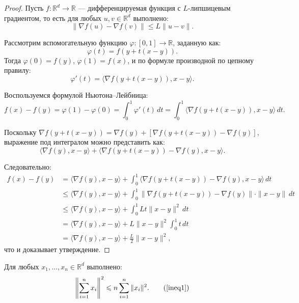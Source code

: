 \begin{proof}
Пусть \(f : \mathbb{R}^d \to \mathbb{R}\) — дифференцируемая функция с \(L\)-липшицевым градиентом, то есть для любых \(u, v \in \mathbb{R}^d\) выполнено:
\[
\|\nabla f(u) - \nabla f(v)\| \leqslant L \|u - v\|.
\]

Рассмотрим вспомогательную функцию \(\varphi : [0, 1] \to \mathbb{R}\), заданную как:
\[
\varphi(t) = f(y + t(x - y)).
\]
Тогда \(\varphi(0) = f(y)\), \(\varphi(1) = f(x)\), и по формуле производной по цепному правилу:
\[
\varphi'(t) = \langle \nabla f(y + t(x - y)), x - y \rangle.
\]

Воспользуемся формулой Ньютона–Лейбница:
\[
f(x) - f(y) = \varphi(1) - \varphi(0) = \int_0^1 \varphi'(t) \, dt = \int_0^1 \langle \nabla f(y + t(x - y)), x - y \rangle \, dt.
\]

Поскольку \(\nabla f(y + t(x - y)) = \nabla f(y) + \left[\nabla f(y + t(x - y)) - \nabla f(y)\right]\), выражение под интегралом можно представить как:
\[
\langle \nabla f(y), x - y \rangle + \langle \nabla f(y + t(x - y)) - \nabla f(y), x - y \rangle.
\]

Следовательно:
\begin{align*}
f(x) - f(y) &= \langle \nabla f(y), x - y \rangle + \int_0^1 \langle \nabla f(y + t(x - y)) - \nabla f(y), x - y \rangle \, dt \\
&\leqslant \langle \nabla f(y), x - y \rangle + \int_0^1 \|\nabla f(y + t(x - y)) - \nabla f(y)\| \cdot \|x - y\| \, dt \\
&\leqslant \langle \nabla f(y), x - y \rangle + \int_0^1 L t \|x - y\|^2 \, dt \\
&= \langle \nabla f(y), x - y \rangle + L \|x - y\|^2 \int_0^1 t \, dt \\
&= \langle \nabla f(y), x - y \rangle + \frac{L}{2} \|x - y\|^2,
\end{align*}
что и доказывает утверждение.
\end{proof}



\begin{lemma}\label{lem:cb}
Для любых \(x_1, \dots, x_n \in \mathbb{R}^d\) выполнено:
\[
\left\|\sum_{i=1}^{n} x_i\right\|^2 \leqslant  n \sum_{i=1}^{n} \|x_i\|^2. \tag{\ref{ineq1}}
\]
\end{lemma}

